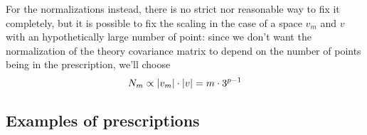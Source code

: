 For the normalizations instead, there is no strict nor reasonable way to fix it
completely, but it is possible to fix the scaling in the case of a space
$v_m$ and $v$ with an hypothetically large number of point: since we don't want
the normalization of the theory covariance matrix to depend on the number of
points being in the prescription, we'll choose
\begin{equation}
    \label{eq:N-norm}
    N_m \propto \abs{v_m} \cdot \abs{v} = m \cdot 3^{p-1}
\end{equation}

\subsection{Examples of prescriptions}
\label{sec:main-ex}

